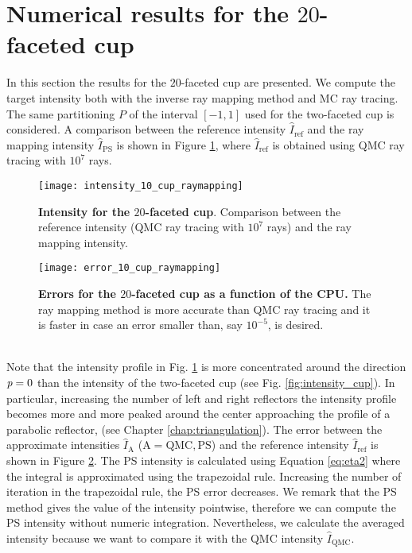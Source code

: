 \section{Numerical results for the $20$-faceted cup}
\label{sec:Numerical results_10cup}
In this section the results for the $20$-faceted cup are presented.
We compute the target intensity both with the inverse ray mapping method and MC ray tracing.
The same partitioning $P$ of the interval $[-1,1]$ used for the two-faceted cup is considered. A comparison between the reference intensity $\hat{I}_{\textrm{ref}}$ and the ray mapping intensity $\hat{I}_{\textrm{PS}}$ is shown in Figure \ref{fig:intensity10cup}, where $\hat{I}_{\textrm{ref}}$ is obtained using QMC ray tracing with $10^7$ rays.
\begin{figure}[h!]
\centering
\texttt{[image: intensity\_10\_cup\_raymapping]}
\caption{\textbf{Intensity for the $20$-faceted cup}.
Comparison between the reference intensity (QMC ray tracing with $10^7$ rays) and the ray mapping intensity.}
\label{fig:intensity10cup}
\end{figure}
\begin{figure}[h!]
\centering
\texttt{[image: error\_10\_cup\_raymapping]}
\caption{\textbf{Errors for the $20$-faceted cup as a function of the CPU.} The ray mapping method is more accurate than QMC ray tracing and it is faster in case an error smaller than, say $10^{-5}$, is desired.}
\label{fig:error10cup} 
\end{figure}
\\ \indent Note that the intensity profile in Fig. \ref{fig:intensity10cup} is more concentrated around the direction $\textit{p}=0$ than the intensity of the two-faceted cup (see Fig. \ref{fig:intensity_cup}). In particular, increasing the number of left and right reflectors the intensity profile becomes more and more peaked around the center approaching the profile of a parabolic reflector, (see Chapter \ref{chap:triangulation}).
The error between the approximate intensities $\hat{I}_{\textrm{A}}$ ($\textrm{A} = \textrm{QMC}, \textrm{PS}$) and the reference intensity $\hat{I}_{\textrm{ref}}$ is shown in Figure \ref{fig:error10cup}. 
The PS intensity is calculated using Equation \ref{eq:eta2} where the integral is approximated using the trapezoidal rule. Increasing the number of iteration in the trapezoidal rule, the PS error decreases. 
We remark that the PS method gives the value of the intensity pointwise, therefore we can compute the PS intensity without numeric integration. Nevertheless, we calculate the averaged intensity because we want to compare it with the QMC intensity $\hat{I}_{\textrm{QMC}}$.
